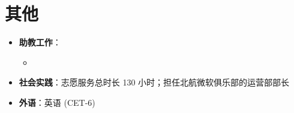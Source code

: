 \documentclass{resume}
\begin{document}
\section{其他}
\begin{itemize}
  \item \textbf{助教工作}：
        \begin{itemize}
          \item {}
        \end{itemize}
  \item \textbf{社会实践}：志愿服务总时长 130 小时；担任北航微软俱乐部的运营部部长
  \item \textbf{外语}：英语 (CET-6)
\end{itemize}
\end{document}
